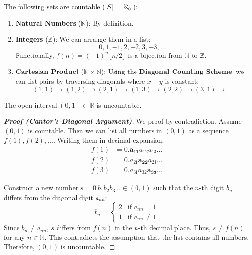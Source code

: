 \documentclass[
	UTF-8,
	11pt, %
	a4paper, %
]{LegrandOrangeBook}
\begin{document}
    \begin{example}
    The following sets are countable ($|S| = \aleph_0$):
    \begin{enumerate}
        \item \textbf{Natural Numbers} ($\mathbb{N}$): By definition.
        
        \item \textbf{Integers} ($\mathbb{Z}$): We can arrange them in a list:
        \[ 0, 1, -1, 2, -2, 3, -3, \dots \]
        Functionally, $f(n) = (-1)^n \lfloor n/2 \rfloor$ is a bijection from $\mathbb{N}$ to $\mathbb{Z}$.
        
        \item \textbf{Cartesian Product} ($\mathbb{N} \times \mathbb{N}$): 
        Using the \textbf{Diagonal Counting Scheme}, we can list pairs by traversing diagonals where $x+y$ is constant:
        \[ (1,1) \to (1,2) \to (2,1) \to (1,3) \to (2,2) \to (3,1) \to \dots \]
    \end{enumerate}
    \end{example}

    \begin{theorem}
    The open interval $(0, 1) \subset \mathbb{R}$ is uncountable.
    \end{theorem}

    \begin{proof}[\textbf{Proof (Cantor's Diagonal Argument)}]
    We proof by contradiction. Assume $(0, 1)$ is countable. 
    Then we can list all numbers in $(0,1)$ as a sequence $f(1), f(2), \dots$. Writing them in decimal expansion:
    \begin{align*}
        f(1) &= 0.\mathbf{a_{11}} a_{12} a_{13} \dots \\
        f(2) &= 0.a_{21} \mathbf{a_{22}} a_{23} \dots \\
        f(3) &= 0.a_{31} a_{32} \mathbf{a_{33}} \dots \\
        &\vdots
    \end{align*}
    Construct a new number $s = 0.b_1 b_2 b_3 \dots \in (0,1)$ such that the $n$-th digit $b_n$ differs from the diagonal digit $a_{nn}$:
    \[
    b_n = \begin{cases} 
    2 & \text{if } a_{nn} = 1 \\
    1 & \text{if } a_{nn} \neq 1 
    \end{cases}
    \]
    Since $b_n \neq a_{nn}$, $s$ differs from $f(n)$ in the $n$-th decimal place. Thus, $s \neq f(n)$ for any $n \in \mathbb{N}$. This contradicts the assumption that the list contains all numbers. Therefore, $(0,1)$ is uncountable.
    \end{proof}
\end{document}
